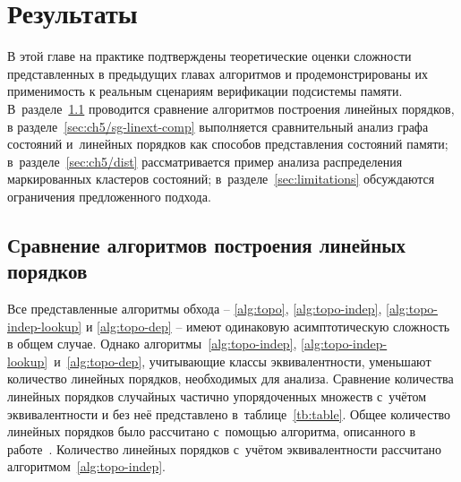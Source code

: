 \chapter{Результаты}
\label{ch:ch5}

В этой главе на практике подтверждены теоретические оценки сложности
представленных в предыдущих главах алгоритмов и продемонстрированы их
применимость к реальным сценариям верификации подсистемы памяти.
В~разделе~\ref{sec:ch5/indep-dep} проводится
сравнение алгоритмов построения линейных порядков, в
разделе~\ref{sec:ch5/sg-linext-comp} выполняется сравнительный анализ графа
состояний и~линейных порядков как способов представления состояний памяти;
в~разделе~\ref{sec:ch5/dist} рассматривается пример анализа распределения
маркированных кластеров состояний; в~разделе~\ref{sec:limitations}
обсуждаются ограничения предложенного подхода.

\section{Сравнение алгоритмов построения линейных порядков}
\label{sec:ch5/indep-dep}

Все представленные алгоритмы обхода -- \ref{alg:topo},
\ref{alg:topo-indep}, \ref{alg:topo-indep-lookup} и
\ref{alg:topo-dep} -- имеют одинаковую асимптотическую сложность в
общем случае. Однако алгоритмы~\ref{alg:topo-indep},
\ref{alg:topo-indep-lookup}~и~\ref{alg:topo-dep}, учитывающие классы
эквивалентности, уменьшают количество линейных порядков,
необходимых для анализа. Сравнение количества линейных порядков
случайных частично упорядоченных множеств с~учётом эквивалентности и
без неё представлено в~таблице~\ref{tb:table}. Общее количество
линейных порядков было рассчитано с~помощью алгоритма, описанного в
работе~\cite{poset}. Количество линейных порядков с~учётом
эквивалентности рассчитано алгоритмом~\ref{alg:topo-indep}.

